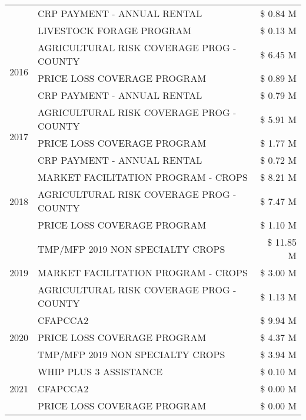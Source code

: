 \begin{tabular}{llr}
 & CRP PAYMENT - ANNUAL RENTAL & \$ 0.84 M \\
 & LIVESTOCK FORAGE PROGRAM & \$ 0.13 M \\
\cline{1-3}
\multirow[t]{3}{*}{2016} & AGRICULTURAL RISK COVERAGE PROG - COUNTY & \$ 6.45 M \\
 & PRICE LOSS COVERAGE PROGRAM & \$ 0.89 M \\
 & CRP PAYMENT - ANNUAL RENTAL & \$ 0.79 M \\
\cline{1-3}
\multirow[t]{3}{*}{2017} & AGRICULTURAL RISK COVERAGE PROG - COUNTY & \$ 5.91 M \\
 & PRICE LOSS COVERAGE PROGRAM & \$ 1.77 M \\
 & CRP PAYMENT - ANNUAL RENTAL & \$ 0.72 M \\
\cline{1-3}
\multirow[t]{3}{*}{2018} & MARKET FACILITATION PROGRAM - CROPS & \$ 8.21 M \\
 & AGRICULTURAL RISK COVERAGE PROG - COUNTY & \$ 7.47 M \\
 & PRICE LOSS COVERAGE PROGRAM & \$ 1.10 M \\
\cline{1-3}
\multirow[t]{3}{*}{2019} & TMP/MFP 2019 NON SPECIALTY CROPS & \$ 11.85 M \\
 & MARKET FACILITATION PROGRAM - CROPS & \$ 3.00 M \\
 & AGRICULTURAL RISK COVERAGE PROG - COUNTY & \$ 1.13 M \\
\cline{1-3}
\multirow[t]{3}{*}{2020} & CFAPCCA2 & \$ 9.94 M \\
 & PRICE LOSS COVERAGE PROGRAM & \$ 4.37 M \\
 & TMP/MFP 2019 NON SPECIALTY CROPS & \$ 3.94 M \\
\cline{1-3}
\multirow[t]{3}{*}{2021} & WHIP PLUS 3 ASSISTANCE & \$ 0.10 M \\
 & CFAPCCA2 & \$ 0.00 M \\
 & PRICE LOSS COVERAGE PROGRAM & \$ 0.00 M \\
\cline{1-3}
\bottomrule
\end{tabular}
